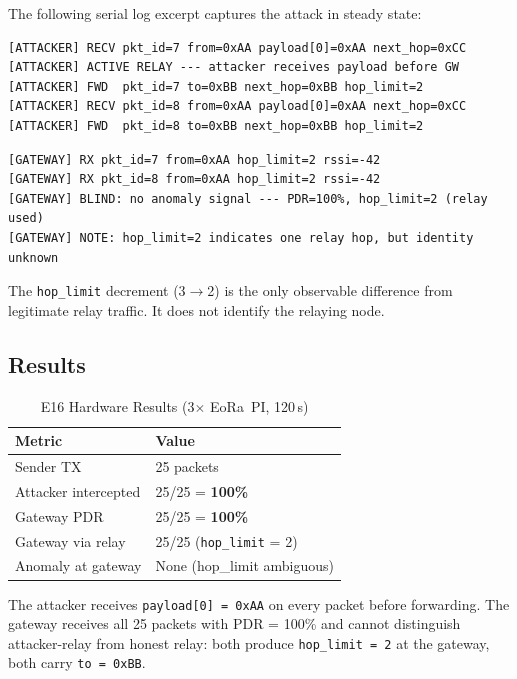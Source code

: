 \documentclass[journal]{IEEEtran}
\begin{document}
The following serial log excerpt captures the attack in steady state:

\begin{lstlisting}[caption={E16 serial log --- attacker node (steady state)}]
[ATTACKER] RECV pkt_id=7 from=0xAA payload[0]=0xAA next_hop=0xCC
[ATTACKER] ACTIVE RELAY --- attacker receives payload before GW
[ATTACKER] FWD  pkt_id=7 to=0xBB next_hop=0xBB hop_limit=2
[ATTACKER] RECV pkt_id=8 from=0xAA payload[0]=0xAA next_hop=0xCC
[ATTACKER] FWD  pkt_id=8 to=0xBB next_hop=0xBB hop_limit=2
\end{lstlisting}

\begin{lstlisting}[caption={E16 serial log --- gateway node (simultaneous)}]
[GATEWAY] RX pkt_id=7 from=0xAA hop_limit=2 rssi=-42
[GATEWAY] RX pkt_id=8 from=0xAA hop_limit=2 rssi=-42
[GATEWAY] BLIND: no anomaly signal --- PDR=100%, hop_limit=2 (relay used)
[GATEWAY] NOTE: hop_limit=2 indicates one relay hop, but identity unknown
\end{lstlisting}

The \texttt{hop\_limit} decrement (3$\to$2) is the only observable difference
from legitimate relay traffic. It does not identify the relaying node.

\subsection{Results}

\begin{table}[h]
  \centering
  \caption{E16 Hardware Results (3$\times$ EoRa~PI, 120\,s)}
  \label{tab:e16}
  \begin{tabular}{ll}
    \toprule
    Metric & Value \\
    \midrule
    Sender TX & 25 packets \\
    Attacker intercepted & 25/25 = \textbf{100\%} \\
    Gateway PDR & 25/25 = \textbf{100\%} \\
    Gateway via relay & 25/25 (\texttt{hop\_limit} = 2) \\
    Anomaly at gateway & None (hop\_limit ambiguous) \\
    \bottomrule
  \end{tabular}
\end{table}

The attacker receives \texttt{payload[0] = 0xAA} on every packet before
forwarding. The gateway receives all 25 packets with PDR = 100\% and
cannot distinguish attacker-relay from honest relay: both produce
\texttt{hop\_limit = 2} at the gateway, both carry \texttt{to = 0xBB}.
\end{document}
